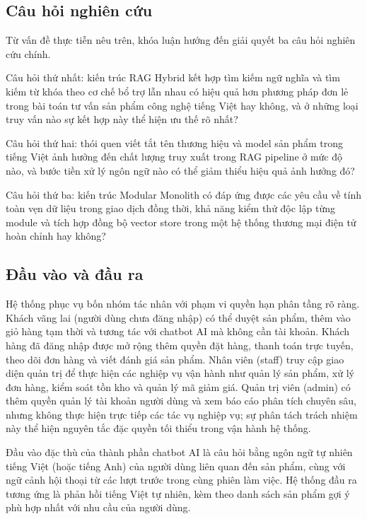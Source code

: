 \subsection{Câu hỏi nghiên cứu}

Từ vấn đề thực tiễn nêu trên, khóa luận hướng đến giải quyết ba câu hỏi nghiên cứu chính.

Câu hỏi thứ nhất: kiến trúc RAG Hybrid kết hợp tìm kiếm ngữ nghĩa và tìm kiếm từ khóa theo cơ chế bổ trợ lẫn nhau có hiệu quả hơn phương pháp đơn lẻ trong bài toán tư vấn sản phẩm công nghệ tiếng Việt hay không, và ở những loại truy vấn nào sự kết hợp này thể hiện ưu thế rõ nhất?

Câu hỏi thứ hai: thói quen viết tắt tên thương hiệu và model sản phẩm trong tiếng Việt ảnh hưởng đến chất lượng truy xuất trong RAG pipeline ở mức độ nào, và bước tiền xử lý ngôn ngữ nào có thể giảm thiểu hiệu quả ảnh hưởng đó?

Câu hỏi thứ ba: kiến trúc Modular Monolith có đáp ứng được các yêu cầu về tính toàn vẹn dữ liệu trong giao dịch đồng thời, khả năng kiểm thử độc lập từng module và tích hợp đồng bộ vector store trong một hệ thống thương mại điện tử hoàn chỉnh hay không?

\subsection{Đầu vào và đầu ra}

Hệ thống phục vụ bốn nhóm tác nhân với phạm vi quyền hạn phân tầng rõ ràng. Khách vãng lai (người dùng chưa đăng nhập) có thể duyệt sản phẩm, thêm vào giỏ hàng tạm thời và tương tác với chatbot AI mà không cần tài khoản. Khách hàng đã đăng nhập được mở rộng thêm quyền đặt hàng, thanh toán trực tuyến, theo dõi đơn hàng và viết đánh giá sản phẩm. Nhân viên (staff) truy cập giao diện quản trị để thực hiện các nghiệp vụ vận hành như quản lý sản phẩm, xử lý đơn hàng, kiểm soát tồn kho và quản lý mã giảm giá. Quản trị viên (admin) có thêm quyền quản lý tài khoản người dùng và xem báo cáo phân tích chuyên sâu, nhưng không thực hiện trực tiếp các tác vụ nghiệp vụ; sự phân tách trách nhiệm này thể hiện nguyên tắc đặc quyền tối thiểu trong vận hành hệ thống.

Đầu vào đặc thù của thành phần chatbot AI là câu hỏi bằng ngôn ngữ tự nhiên tiếng Việt (hoặc tiếng Anh) của người dùng liên quan đến sản phẩm, cùng với ngữ cảnh hội thoại từ các lượt trước trong cùng phiên làm việc. Hệ thống đầu ra tương ứng là phản hồi tiếng Việt tự nhiên, kèm theo danh sách sản phẩm gợi ý phù hợp nhất với nhu cầu của người dùng.

